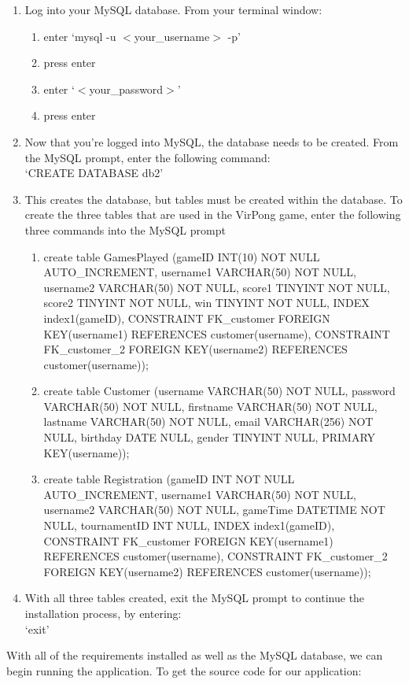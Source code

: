 		\begin{enumerate}
			\item Log into your MySQL database. From your terminal window:
			\begin{enumerate}
				\item enter `mysql -u $<$your\_username$>$ -p'
				\item press enter
				\item enter `$<$your\_password$>$'
				\item press enter
			\end{enumerate}
			\item Now that you're logged into MySQL, the database needs to be created. From the MySQL prompt, enter the following command:\\`CREATE DATABASE db2'
			\item This creates the database, but tables must be created within the database. To create the three tables that are used in the VirPong game, enter the following three commands into the MySQL prompt
			\begin{enumerate}
				\item create table GamesPlayed (gameID INT(10) NOT NULL AUTO\_INCREMENT, username1 VARCHAR(50) NOT NULL, username2 VARCHAR(50) NOT NULL, score1 TINYINT NOT NULL, score2 TINYINT NOT NULL, win TINYINT NOT NULL, INDEX index1(gameID), CONSTRAINT FK\_customer FOREIGN KEY(username1) REFERENCES customer(username), CONSTRAINT FK\_customer\_2 FOREIGN KEY(username2) REFERENCES customer(username));
				\item create table Customer (username VARCHAR(50) NOT NULL, password VARCHAR(50) NOT NULL, firstname VARCHAR(50) NOT NULL, lastname VARCHAR(50) NOT NULL, email VARCHAR(256) NOT NULL, birthday DATE NULL, gender TINYINT NULL, PRIMARY KEY(username));
				\item create table Registration (gameID INT NOT NULL AUTO\_INCREMENT, username1 VARCHAR(50) NOT NULL, username2 VARCHAR(50) NOT NULL, gameTime DATETIME NOT NULL, tournamentID INT NULL,  INDEX index1(gameID), CONSTRAINT FK\_customer FOREIGN KEY(username1) REFERENCES customer(username), CONSTRAINT FK\_customer\_2 FOREIGN KEY(username2) REFERENCES customer(username));
			\end{enumerate}
			\item With all three tables created, exit the MySQL prompt to continue the installation process, by entering:\\`exit'
		\end{enumerate}
		With all of the requirements installed as well as the MySQL database, we can begin running the application. To get the source code for our application:
